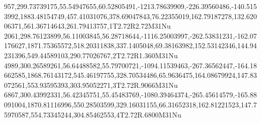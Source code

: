 957,299.73739175,55.54947655,60.52805491,-1213.78639909,-226.39560486,-140.5153992,1883.48154749,457.41031076,378.69047843,76.22355019,162.79187278,132.62006371,561.36714643,261.79413757,1T2.72R2.72M31Nu
2061,298.76123899,56.11003845,56.28718644,-1116.25003997,-262.53831231,-162.07176627,1871.75365572,518.20311838,337.1405048,69.38163982,152.53142346,144.94231396,549.44589103,290.77026767,2T2.72R1.360M31Nu
4989,300.26589261,56.64488582,55.79700721,-1094.11539463,-267.36562447,-164.18662585,1868.76143172,545.46197755,328.70534486,65.9636475,164.08679924,147.83072561,553.93595393,303.95052271,3T2.72R.9066M31Nu
6867,300.43992331,56.42345751,55.45483769,-1080.39464374,-265.45614579,-165.88091004,1870.81116996,550.28503599,329.16031155,66.31652318,162.81221523,147.75970587,554.73345244,304.85462553,4T2.72R.6800M31Nu
